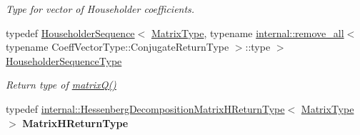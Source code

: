 \begin{DoxyCompactItemize}
\begin{DoxyCompactList}\small\item\em Type for vector of Householder coefficients. \end{DoxyCompactList}\item 
\mbox{\label{class_eigen_1_1_hessenberg_decomposition_a7c1188cd5d8f550c8941df75a50a7d08}} 
typedef \mbox{\hyperlink{class_eigen_1_1_householder_sequence}{Householder\+Sequence}}$<$ \mbox{\hyperlink{class_eigen_1_1_hessenberg_decomposition_a93a611350a7db9d1da18f2c828ecea9f}{Matrix\+Type}}, typename \mbox{\hyperlink{struct_eigen_1_1internal_1_1remove__all}{internal\+::remove\+\_\+all}}$<$ typename Coeff\+Vector\+Type\+::\+Conjugate\+Return\+Type $>$\+::type $>$ \mbox{\hyperlink{class_eigen_1_1_hessenberg_decomposition_a7c1188cd5d8f550c8941df75a50a7d08}{Householder\+Sequence\+Type}}
\begin{DoxyCompactList}\small\item\em Return type of \mbox{\hyperlink{class_eigen_1_1_hessenberg_decomposition_a346441e4902a58d43d698ac3da6ff791}{matrix\+Q()}} \end{DoxyCompactList}\item 
\mbox{\label{class_eigen_1_1_hessenberg_decomposition_accca4cb1b5d78bc41defe77f01b4aada}} 
typedef \mbox{\hyperlink{struct_eigen_1_1internal_1_1_hessenberg_decomposition_matrix_h_return_type}{internal\+::\+Hessenberg\+Decomposition\+Matrix\+H\+Return\+Type}}$<$ \mbox{\hyperlink{class_eigen_1_1_hessenberg_decomposition_a93a611350a7db9d1da18f2c828ecea9f}{Matrix\+Type}} $>$ {\bfseries Matrix\+H\+Return\+Type}
\end{DoxyCompactItemize}

